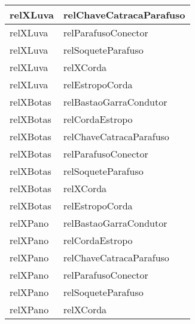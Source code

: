 \begin{center}
\begin{longtable}[H]{|l|l|}
relXLuva                                        & relChaveCatracaParafuso                          \\ \hline
relXLuva                                        & relParafusoConector                              \\ \hline
relXLuva                                        & relSoqueteParafuso                               \\ \hline
relXLuva                                        & relXCorda                                        \\ \hline
relXLuva                                        & relEstropoCorda                                  \\ \hline
relXBotas                                       & relBastaoGarraCondutor                           \\ \hline
relXBotas                                       & relCordaEstropo                                  \\ \hline
relXBotas                                       & relChaveCatracaParafuso                          \\ \hline
relXBotas                                       & relParafusoConector                              \\ \hline
relXBotas                                       & relSoqueteParafuso                               \\ \hline
relXBotas                                       & relXCorda                                        \\ \hline
relXBotas                                       & relEstropoCorda                                  \\ \hline
relXPano                                        & relBastaoGarraCondutor                           \\ \hline
relXPano                                        & relCordaEstropo                                  \\ \hline
relXPano                                        & relChaveCatracaParafuso                          \\ \hline
relXPano                                        & relParafusoConector                              \\ \hline
relXPano                                        & relSoqueteParafuso                               \\ \hline
relXPano                                        & relXCorda                                        \\ \hline

\end{longtable}
\end{center}
